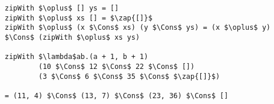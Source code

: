 \begin{frame}[fragile]


\begin{lstlisting}[mathescape=true,numbers=none]
zipWith $\oplus$ [] ys = []
zipWith $\oplus$ xs [] = $\zap{[]}$
zipWith $\oplus$ (x $\Cons$ xs) (y $\Cons$ ys) = (x $\oplus$ y) $\Cons$ (zipWith $\oplus$ xs ys)

zipWith $\lambda$ab.(a + 1, b + 1)
        (10 $\Cons$ 12 $\Cons$ 22 $\Cons$ [])
        (3 $\Cons$ 6 $\Cons$ 35 $\Cons$ $\zap{[]}$)

= (11, 4) $\Cons$ (13, 7) $\Cons$ (23, 36) $\Cons$ []
\end{lstlisting}

\end{frame}

